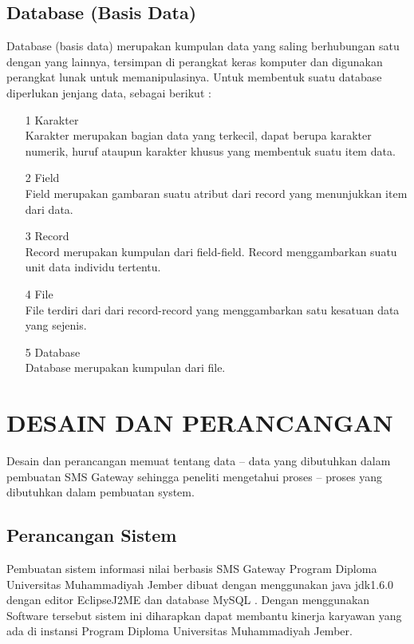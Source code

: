 \documentclass{jtetiproposalskripsi}
\begin{document}
\section{Database (Basis Data)}
Database (basis data) merupakan kumpulan data yang saling berhubungan satu dengan yang lainnya, tersimpan di perangkat keras komputer dan digunakan perangkat lunak untuk memanipulasinya. Untuk membentuk suatu database diperlukan jenjang data, sebagai berikut :
\begin{itemize}
\item[1]Karakter
\\
Karakter merupakan bagian data yang terkecil, dapat berupa karakter numerik, huruf ataupun karakter khusus yang membentuk suatu item data.
\item[2]Field
\\
Field merupakan gambaran suatu atribut dari record yang menunjukkan item dari data.
\item[3]Record
\\
Record merupakan kumpulan dari field-field. Record menggambarkan suatu unit data individu tertentu.
\item[4]File
\\
File terdiri dari dari record-record yang menggambarkan satu kesatuan data yang sejenis.

\item[5]Database
\\
Database merupakan kumpulan dari file.
\end{itemize}



\chapter{DESAIN DAN PERANCANGAN}

Desain dan perancangan memuat tentang data – data yang dibutuhkan dalam pembuatan SMS Gateway sehingga peneliti mengetahui proses – proses yang dibutuhkan dalam pembuatan system.
\section{Perancangan Sistem}
Pembuatan sistem informasi nilai berbasis SMS Gateway Program Diploma Universitas Muhammadiyah Jember dibuat dengan menggunakan java jdk1.6.0 dengan editor EclipseJ2ME dan database MySQL . Dengan menggunakan Software tersebut sistem ini diharapkan dapat membantu kinerja karyawan yang ada di instansi Program Diploma  Universitas Muhammadiyah Jember.
\end{document}
